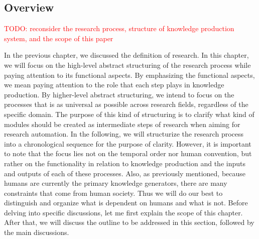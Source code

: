 \documentclass{book}
\begin{document}



\subsection{Overview}

\textcolor{red}{TODO: reconsider the research process, structure of knowledge production system, and the scope of this paper}

In the previous chapter, we discussed the definition of research. In this chapter, we will focus on the high-level abstract structuring of the research process while paying attention to its functional aspects. By emphasizing the functional aspects, we mean paying attention to the role that each step plays in knowledge production. By higher-level abstract structuring, we intend to focus on the processes that is as universal as possible across research fields, regardless of the specific domain. The purpose of this kind of structuring is to clarify what kind of modules should be created as intermediate steps of research when aiming for research automation. In the following, we will structurize the research process into a chronological sequence for the purpose of clarity. However, it is important to note that the focus lies not on the temporal order nor human convention, but rather on the functionality in relation to knowledge production and the inputs and outputs of each of these processes. Also, as previously mentioned, because humans are currently the primary knowledge generators, there are many constraints that come from human society. Thus we will do our best to distinguish and organize what is dependent on humans and what is not. Before delving into specific discussions, let me first explain the scope of this chapter. After that, we will discuss the outline to be addressed in this section, followed by the main discussions.
\end{document}
